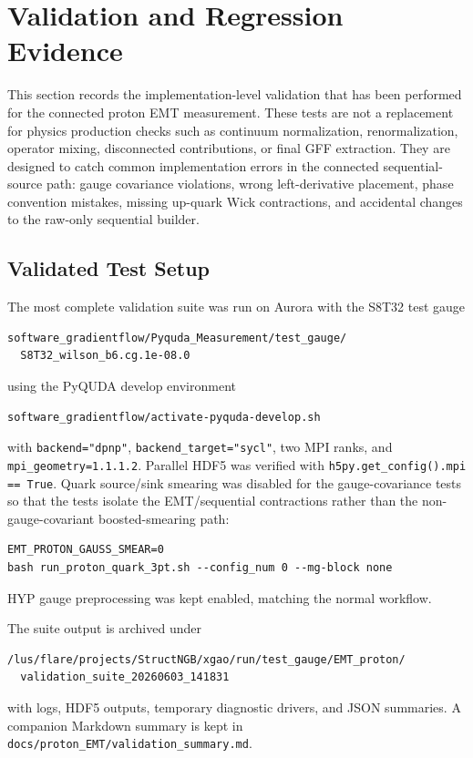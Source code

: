 \documentclass[11pt,a4paper]{article}
\begin{document}
\section{Validation and Regression Evidence}

This section records the implementation-level validation that has been performed
for the connected proton EMT measurement.  These tests are not a replacement for
physics production checks such as continuum normalization, renormalization,
operator mixing, disconnected contributions, or final GFF extraction.  They are
designed to catch common implementation errors in the connected sequential-source
path: gauge covariance violations, wrong left-derivative placement, phase
convention mistakes, missing up-quark Wick contractions, and accidental changes
to the raw-only sequential builder.

\subsection{Validated Test Setup}

The most complete validation suite was run on Aurora with the S8T32 test gauge
\begin{verbatim}
software_gradientflow/Pyquda_Measurement/test_gauge/
  S8T32_wilson_b6.cg.1e-08.0
\end{verbatim}
using the PyQUDA develop environment
\begin{verbatim}
software_gradientflow/activate-pyquda-develop.sh
\end{verbatim}
with \texttt{backend="dpnp"}, \texttt{backend\_target="sycl"}, two MPI ranks, and
\texttt{mpi\_geometry=1.1.1.2}.  Parallel HDF5 was verified with
\texttt{h5py.get\_config().mpi == True}.  Quark source/sink smearing was disabled
for the gauge-covariance tests so that the tests isolate the EMT/sequential
contractions rather than the non-gauge-covariant boosted-smearing path:
\begin{verbatim}
EMT_PROTON_GAUSS_SMEAR=0
bash run_proton_quark_3pt.sh --config_num 0 --mg-block none
\end{verbatim}
HYP gauge preprocessing was kept enabled, matching the normal workflow.

The suite output is archived under
\begin{verbatim}
/lus/flare/projects/StructNGB/xgao/run/test_gauge/EMT_proton/
  validation_suite_20260603_141831
\end{verbatim}
with logs, HDF5 outputs, temporary diagnostic drivers, and JSON summaries.  A
companion Markdown summary is kept in
\texttt{docs/proton\_EMT/validation\_summary.md}.
\end{document}
